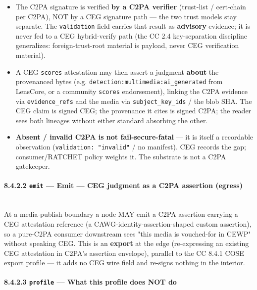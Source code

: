 \documentclass[11pt]{article}
\begin{document}
\begin{itemize}\setlength\itemsep{0pt}
\item The C2PA signature is verified \textbf{by a C2PA verifier} (trust-list / cert-chain per C2PA), NOT by a CEG signature path — the two trust models stay separate. The \texttt{validation} field carries that result as \textbf{advisory} evidence; it is never fed to a CEG hybrid-verify path (the CC 2.4 key-separation discipline generalizes: foreign-trust-root material is payload, never CEG verification material).
\item A CEG \texttt{scores} attestation may then assert a judgment \textbf{about} the provenanced bytes (e.g. \texttt{detection:multimedia:ai\_generated} from LensCore, or a community \texttt{scores} endorsement), linking the C2PA evidence via \texttt{evidence\_refs} and the media via \texttt{subject\_key\_ids} / the blob SHA. The CEG claim is signed CEG; the provenance it cites is signed C2PA; the reader sees both lineages without either standard absorbing the other.
\item \textbf{Absent / invalid C2PA is not fail-secure-fatal} — it is itself a recordable observation (\texttt{validation: "invalid"} / no manifest). CEG records the gap; consumer/RATCHET policy weights it. The substrate is not a C2PA gatekeeper.
\end{itemize}


\paragraph{8.4.2.2 \texttt{emit} — Emit — CEG judgment as a C2PA assertion (egress)}\mbox{}\\


At a media-publish boundary a node MAY emit a C2PA assertion carrying a CEG attestation reference (a CAWG-identity-assertion-shaped custom assertion), so a pure-C2PA consumer downstream sees "this media is vouched-for in CEWP" without speaking CEG. This is an \textbf{export} at the edge (re-expressing an existing CEG attestation in C2PA's assertion envelope), parallel to the CC 8.4.1 COSE export profile — it adds no CEG wire field and re-signs nothing in the interior.


\paragraph{8.4.2.3 \texttt{profile} — What this profile does NOT do}\mbox{}\\
\end{document}

